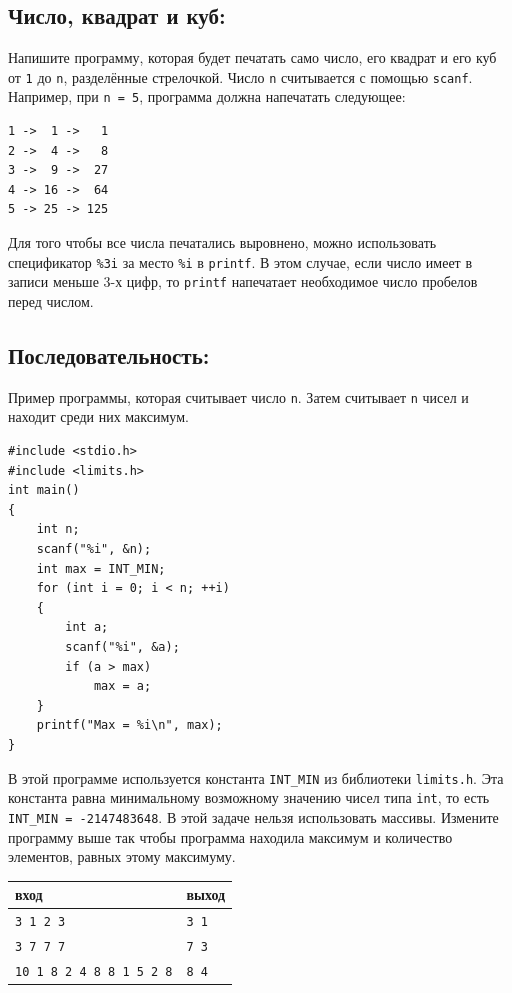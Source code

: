 \documentclass[10pt]{article}
\begin{document}
\subsection{Число, квадрат и куб:} 
Напишите программу, которая будет печатать само число, его квадрат и его куб от \texttt{1} до \texttt{n}, разделённые стрелочкой.
Число \texttt{n} считывается с помощью \texttt{scanf}. 
Например, при \texttt{n = 5}, программа должна напечатать следующее:
\begin{verbatim}
1 ->  1 ->   1
2 ->  4 ->   8
3 ->  9 ->  27
4 -> 16 ->  64
5 -> 25 -> 125
\end{verbatim}
Для того чтобы все числа печатались выровнено, можно использовать спецификатор \texttt{\%3i} за место \texttt{\%i} в \texttt{printf}. В этом случае, если число имеет в записи меньше 3-х цифр, то \texttt{printf} напечатает необходимое число пробелов перед числом.



\subsection{Последовательность:} 
Пример программы, которая считывает число \texttt{n}. Затем считывает \texttt{n} чисел и находит среди них максимум. 

\begin{lstlisting}
#include <stdio.h>
#include <limits.h>
int main() 
{
    int n;
    scanf("%i", &n);
    int max = INT_MIN;
    for (int i = 0; i < n; ++i) 
    {
        int a;
        scanf("%i", &a);
        if (a > max)
            max = a;
    }
    printf("Max = %i\n", max);
}
\end{lstlisting}
В этой программе используется константа \texttt{INT\_MIN} из библиотеки \texttt{limits.h}. Эта константа равна минимальному возможному значению чисел типа \texttt{int}, то есть \texttt{INT\_MIN = -2147483648}. В этой задаче нельзя использовать массивы.
Измените программу выше так чтобы программа находила максимум и количество элементов, равных этому максимуму.
\begin{center}
\begin{tabular}{ l l }
 вход & выход \\ \hline
 \texttt{3 1 2 3} & \texttt{3 1}  \\ 
 \texttt{3 7 7 7} & \texttt{7 3}  \\
 \texttt{10 1 8 2 4 8 8 1 5 2 8} & \texttt{8 4}
\end{tabular}
\end{center}
\end{document}

